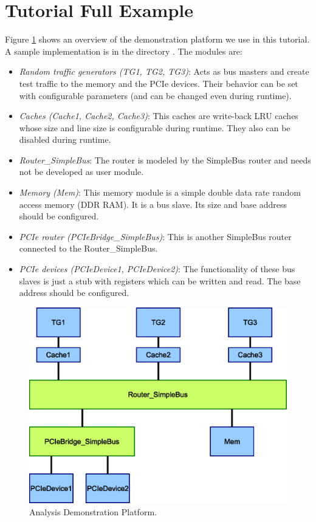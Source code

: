 
\newpage
\section{Tutorial Full Example}

Figure \ref{fig:gavdemoplatform} shows an overview of the demonstration platform we use in this tutorial. A sample implementation is in the directory . The modules are:
\begin{itemize}
	\item \textsl{Random traffic generators (TG1, TG2, TG3)}: Acts as bus
masters and create test traffic to the memory and the PCIe devices. Their
behavior can be set with configurable parameters (and can be changed even during runtime).
	\item \textsl{Caches (Cache1, Cache2, Cache3)}: This caches are write-back LRU caches whose size and line size is configurable during runtime. They also can be disabled during runtime.
	\item \textsl{Router\_SimpleBus}: The router is modeled by the SimpleBus router and needs not be developed as user module.
	\item \textsl{Memory (Mem)}: This memory module is a simple double data rate random access memory (DDR RAM). It is a bus slave. Its size and base address should be configured.
	\item  \textsl{PCIe router (PCIeBridge\_SimpleBus)}: This is another SimpleBus router connected to the {\sffamily Router\_SimpleBus}.
	\item \textsl{PCIe devices (PCIeDevice1, PCIeDevice2)}: The functionality of these bus slaves is just a stub with registers which can be written and read. The base address should be configured.
\end{itemize}

\begin{figure}[H]
	\centerline{
		\includegraphics[width=15cm]{GAVDemoPlatform.eps}} 
	\caption{Analysis Demonstration Platform. }
	\label{fig:gavdemoplatform}
\end{figure}


